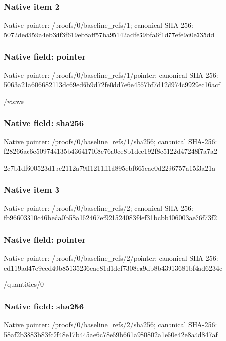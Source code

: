 \documentclass[10pt,a4paper]{article}
\begin{document}
\subsubsection{Native item 2}
Native pointer: /proofs/0/baseline\_\allowbreak{}refs/1; canonical SHA-256: 5072ded359a4eb3df3f619eb8aff57ba95142adfe39bfa6f1d77efe9c0e335dd

\subsubsection{Native field: pointer}
Native pointer: /proofs/0/baseline\_\allowbreak{}refs/1/pointer; canonical SHA-256: 5063a21a606682113dc69ed6b9d72fe0dd7e6e4567bf7d12d974c9929ec16acf

\begingroup\raggedright\sloppy /\allowbreak{}views\par\endgroup

\subsubsection{Native field: sha256}
Native pointer: /proofs/0/baseline\_\allowbreak{}refs/1/sha256; canonical SHA-256: f28266ac6e509744135b4364170f8c76a0ce8b1dee192f8c5122d47248f7a7a2

\begingroup\raggedright\sloppy 2c7b1df600523d1be2112a79ff1211ff1d895ebf665cae0d2296757a15f3a21a\par\endgroup

\subsubsection{Native item 3}
Native pointer: /proofs/0/baseline\_\allowbreak{}refs/2; canonical SHA-256: fb96603310c46beda0b58a152467ef921524083f4ef31bcbb406003ae36f73f2

\subsubsection{Native field: pointer}
Native pointer: /proofs/0/baseline\_\allowbreak{}refs/2/pointer; canonical SHA-256: cd119ad47e9ced40b85135236eae81d1dcf7308ea9db8b43913681bf4ad6234c

\begingroup\raggedright\sloppy /\allowbreak{}quantities/\allowbreak{}0\par\endgroup

\subsubsection{Native field: sha256}
Native pointer: /proofs/0/baseline\_\allowbreak{}refs/2/sha256; canonical SHA-256: 58af2b3883b83fc2f48e17b445ae6c78e69b661a980802a1e50e42e8a4d847af
\end{document}
